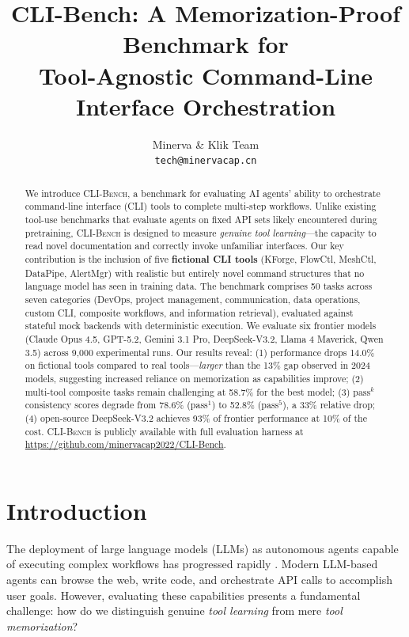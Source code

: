 \documentclass{article}
\title{CLI-Bench: A Memorization-Proof Benchmark for\\Tool-Agnostic Command-Line Interface Orchestration}
\author{
  Minerva \& Klik Team\\
  \texttt{tech@minervacap.cn}
}
\newcommand{\clibench}{\textsc{CLI-Bench}}
\newcommand{\passmark}{\text{pass}^k}
\begin{document}
\maketitle

\begin{abstract}
We introduce \clibench{}, a benchmark for evaluating AI agents' ability to orchestrate command-line interface (CLI) tools to complete multi-step workflows. Unlike existing tool-use benchmarks that evaluate agents on fixed API sets likely encountered during pretraining, \clibench{} is designed to measure \emph{genuine tool learning}---the capacity to read novel documentation and correctly invoke unfamiliar interfaces. Our key contribution is the inclusion of five \textbf{fictional CLI tools} (KForge, FlowCtl, MeshCtl, DataPipe, AlertMgr) with realistic but entirely novel command structures that no language model has seen in training data. The benchmark comprises 50 tasks across seven categories (DevOps, project management, communication, data operations, custom CLI, composite workflows, and information retrieval), evaluated against stateful mock backends with deterministic execution. We evaluate six frontier models (Claude Opus 4.5, GPT-5.2, Gemini 3.1 Pro, DeepSeek-V3.2, Llama 4 Maverick, Qwen 3.5) across 9,000 experimental runs. Our results reveal: (1) performance drops 14.0\% on fictional tools compared to real tools---\emph{larger} than the 13\% gap observed in 2024 models, suggesting increased reliance on memorization as capabilities improve; (2) multi-tool composite tasks remain challenging at 58.7\% for the best model; (3) $\passmark$ consistency scores degrade from 78.6\% (pass$^1$) to 52.8\% (pass$^5$), a 33\% relative drop; (4) open-source DeepSeek-V3.2 achieves 93\% of frontier performance at 10\% of the cost. \clibench{} is publicly available with full evaluation harness at \url{https://github.com/minervacap2022/CLI-Bench}.
\end{abstract}

\section{Introduction}
\label{sec:intro}

The deployment of large language models (LLMs) as autonomous agents capable of executing complex workflows has progressed rapidly \citep{agentbench2023, webarena2023}. Modern LLM-based agents can browse the web, write code, and orchestrate API calls to accomplish user goals. However, evaluating these capabilities presents a fundamental challenge: how do we distinguish genuine \emph{tool learning} from mere \emph{tool memorization}?
\end{document}
